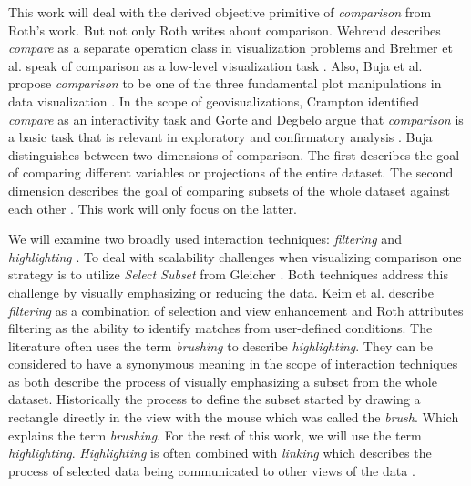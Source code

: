 This work will deal with the derived objective primitive of \textit{comparison} from Roth's work. But not only Roth writes about comparison.
Wehrend describes \textit{compare} as a separate operation class in visualization problems \citep{Wehrend.1990} and Brehmer et al. speak
of comparison as a low-level visualization task \citep*{Brehmer.2013}. Also, Buja et al. propose \textit{comparison} to be one of the three
fundamental plot manipulations in data visualization \citep*{Buja.1996}. In the scope of geovisualizations, Crampton identified \textit{compare}
as an interactivity task \citep{Crampton.2002} and Gorte and Degbelo argue that \textit{comparison} is a basic task that is relevant in
exploratory and confirmatory analysis \citep{Gorte.2022}. Buja distinguishes between two dimensions of comparison. The first describes the
goal of comparing different variables or projections of the entire dataset. The second dimension describes the goal of comparing subsets
of the whole dataset against each other \citep*{Buja.1996}. This work will only focus on the latter.

We will examine two broadly used interaction techniques: \textit{filtering} and \textit{highlighting} \citep*{Keim.2005,Roth.2013}.
To deal with scalability challenges when visualizing comparison one strategy is to utilize \textit{Select Subset} from Gleicher
\citep*{Gleicher.2018}. Both techniques address this challenge by visually emphasizing or reducing the data. Keim et al. describe
\textit{filtering} as a combination of selection and view enhancement and Roth attributes filtering as the ability to identify
matches from user-defined conditions. The literature often uses the term \textit{brushing} to describe \textit{highlighting}. They
can be considered to have a synonymous meaning in the scope of interaction techniques as both describe the process of visually
emphasizing a subset from the whole dataset. Historically the process to define the subset started by drawing a rectangle directly
in the view with the mouse which was called the \textit{brush}. Which explains the term \textit{brushing}. For the rest of this work,
we will use the term \textit{highlighting}. \textit{Highlighting} is often combined with \textit{linking} which describes the process
of selected data being communicated to other views of the data \citep*{Keim.2005,Andrienko.2020}.

